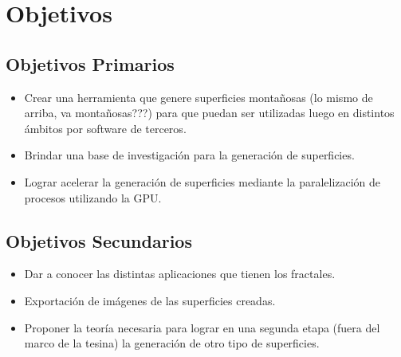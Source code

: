 \documentclass[12pt]{article} %
\begin{document}

\renewcommand{\contentsname}{Índice}
\tableofcontents %

\newpage %


\section{Objetivos} %



\subsection{Objetivos Primarios} %

\begin{itemize}
\item Crear una herramienta que genere superficies montañosas (lo mismo de arriba, va montañosas???) para que puedan ser utilizadas luego en distintos ámbitos por software de terceros.
\item Brindar una base de investigación para la generación de superficies.
\item Lograr acelerar la generación de superficies mediante la paralelización de procesos utilizando la GPU.
\end{itemize}



\subsection{Objetivos Secundarios} %

\begin{itemize}
\item Dar a conocer las distintas aplicaciones que tienen los fractales.
\item Exportación de imágenes de las superficies creadas.
\item Proponer la teoría necesaria para lograr en una segunda etapa (fuera del marco de la tesina) la generación de otro tipo de superficies. %
\end{itemize}
\end{document}
